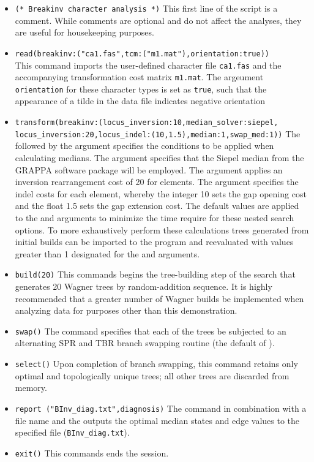 \begin{itemize}
\item \texttt{(* Breakinv character analysis  *)} This first line of the script is a comment. While comments 
are optional and do not affect the analyses, they are useful for housekeeping purposes.
\item \texttt{read(breakinv:("ca1.fas",tcm:("m1.mat"),orientation:true))} \\ This command imports the user-defined 
 character file \texttt{ca1.fas} and the accompanying transformation cost matrix \texttt{m1.mat}.
The argeument \texttt{orientation} for these character types is set as \texttt{true}, such that the appearance of a tilde in the data file
indicates negative orientation
\item \texttt{transform(breakinv:(locus\_inversion:10,median\_solver:siepel,\\locus\_inversion:20,locus\_indel:(10,1.5),median:1,swap\_med:1))}  
The  followed by the argument  
specifies the conditions to be applied when calculating medians. The argument \poyargument{[median
\_solver:siepel} specifies that the Siepel median from the GRAPPA software package \cite{baderetal2002} will be 
employed.  The argument  applies an inversion rearrangement cost of 20 for 
 elements. The argument  specifies the indel costs for 
each  element, whereby the integer 10 sets the gap opening cost and the float 1.5 sets the 
gap extension cost.  The default values are applied to the  and  
arguments to minimize the time require for these nested search options.   To more exhaustively perform these 
calculations trees generated from initial builds can be imported to the program and reevaluated with values greater 
than 1 designated for the  and  arguments.
\item \texttt{build(20)} This commands begins the tree-building step of the search that generates 20 Wagner trees by
 random-addition sequence.  It is highly recommended that a greater number of Wagner builds be implemented when 
 analyzing data for purposes other than this demonstration.
\item \texttt{swap()} The  command specifies that each of the trees be subjected to an alternating 
SPR and TBR branch swapping routine (the default of \poy).
\item \texttt{select()} Upon completion of branch swapping, this command retains only optimal and topologically 
unique trees; all other trees are discarded from memory. 
\item \texttt{report ("BInv\_diag.txt",diagnosis)}  The  command in combination with a file name and 
the  outputs the optimal median states and edge values to the specified file (\texttt{BInv\_diag.txt}). 
\item \texttt{exit()} This commands ends the \poy session.
\end{itemize}

